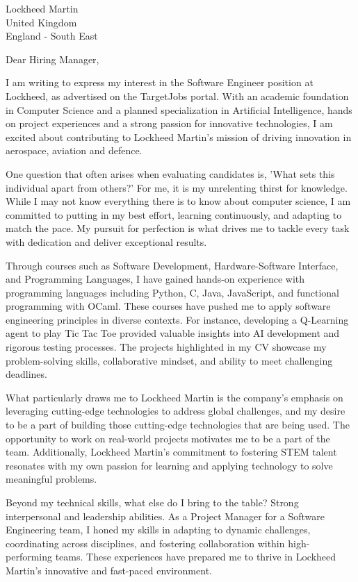 \documentclass{letter}
\begin{document}
\begin{letter}{Lockheed Martin \\ United Kingdom \\ England - South East}

\opening{Dear Hiring Manager,}

I am writing to express my interest in the Software Engineer position at Lockheed, as advertised on the TargetJobs portal. With an academic foundation in Computer Science and a planned specialization in Artificial Intelligence, hands on project experiences and a strong passion for innovative technologies, I am excited about contributing to Lockheed Martin's mission of driving innovation in aerospace, aviation and defence.

One question that often arises when evaluating candidates is, 'What sets this individual apart from others?' For me, it is my unrelenting thirst for knowledge. While I may not know everything there is to know about computer science, I am committed to putting in my best effort, learning continuously, and adapting to match the pace. My pursuit for perfection is what drives me to tackle every task with dedication and deliver exceptional results.

Through courses such as Software Development, Hardware-Software Interface, and Programming Languages, I have gained hands-on experience with programming languages including Python, C, Java, JavaScript, and functional programming with OCaml. These courses have pushed me to apply software engineering principles in diverse contexts. For instance, developing a Q-Learning agent to play Tic Tac Toe provided valuable insights into AI development and rigorous testing processes. The projects highlighted in my CV showcase my problem-solving skills, collaborative mindset, and ability to meet challenging deadlines.

What particularly draws me to Lockheed Martin is the company's emphasis on leveraging cutting-edge technologies to address global challenges, and my desire to be a part of building those cutting-edge technologies that are being used. The opportunity to work on real-world projects motivates me to be a part of the team. Additionally, Lockheed Martin's commitment to fostering STEM talent resonates with my own passion for learning and applying technology to solve meaningful problems.

Beyond my technical skills, what else do I bring to the table? Strong interpersonal and leadership abilities. As a Project Manager for a Software Engineering team, I honed my skills in adapting to dynamic challenges, coordinating across disciplines, and fostering collaboration within high-performing teams. These experiences have prepared me to thrive in Lockheed Martin's innovative and fast-paced environment.


\end{letter}
\end{document}
